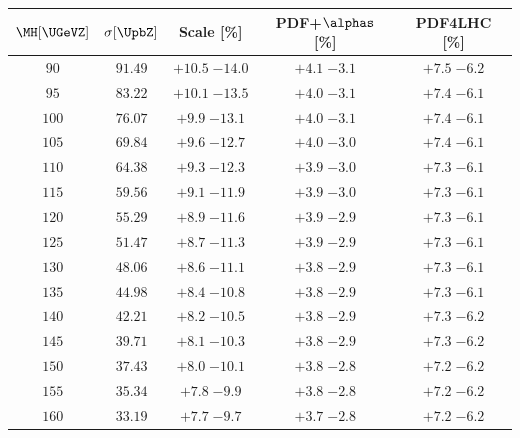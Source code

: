 \begin{table}

   \begin{center}
   \small
   \begin{tabular}{ccccc}
   \hline
   $\MH[\UGeVZ]$ & $\sigma[\UpbZ]$ & Scale [\%] & PDF+$\alphas$ [\%] & \small{PDF4LHC} [\%]\\
   \hline
 $ 90 $&$ 91.49 $& $ {+10.5}  \;{-14.0} $ & $ {+ 4.1}  \;{- 3.1} $ & $ {+ 7.5}  \;{- 6.2} $ \\
 $ 95 $&$ 83.22 $& $ {+10.1}  \;{-13.5} $ & $ {+ 4.0}  \;{- 3.1} $ & $ {+ 7.4}  \;{- 6.1} $ \\
 $100 $&$ 76.07$ & $ {+ 9.9}  \;{-13.1} $ & $ {+ 4.0}  \;{- 3.1} $ & $ {+ 7.4}  \;{- 6.1} $ \\
 $105 $&$ 69.84$ & $ {+ 9.6}  \;{-12.7} $ & $ {+ 4.0}  \;{- 3.0} $ & $ {+ 7.4}  \;{- 6.1} $ \\
 $110 $&$ 64.38 $& $ {+ 9.3}  \;{-12.3} $ & $ {+ 3.9}  \;{- 3.0} $ & $ {+ 7.3}  \;{- 6.1} $ \\
 $115 $&$ 59.56 $& $ {+ 9.1}  \;{-11.9} $ & $ {+ 3.9}  \;{- 3.0} $ & $ {+ 7.3}  \;{- 6.1} $ \\
 $120 $&$ 55.29 $& $ {+ 8.9}  \;{-11.6} $ & $ {+ 3.9}  \;{- 2.9} $ & $ {+ 7.3}  \;{- 6.1} $ \\
 $125 $&$ 51.47 $& $ {+ 8.7}  \;{-11.3} $ & $ {+ 3.9}  \;{- 2.9} $ & $ {+ 7.3}  \;{- 6.1} $ \\
 $130 $&$ 48.06 $& $ {+ 8.6}  \;{-11.1} $ & $ {+ 3.8}  \;{- 2.9} $ & $ {+ 7.3}  \;{- 6.1} $ \\
 $135 $&$ 44.98 $& $ {+ 8.4}  \;{-10.8} $ & $ {+ 3.8}  \;{- 2.9} $ & $ {+ 7.3}  \;{- 6.1} $ \\
 $140 $&$ 42.21 $& $ {+ 8.2}  \;{-10.5} $ & $ {+ 3.8}  \;{- 2.9} $ & $ {+ 7.3}  \;{- 6.2} $ \\
 $145 $&$ 39.71 $& $ {+ 8.1}  \;{-10.3} $ & $ {+ 3.8}  \;{- 2.9} $ & $ {+ 7.3}  \;{- 6.2} $ \\
 $150 $&$ 37.43 $& $ {+ 8.0}  \;{-10.1} $ & $ {+ 3.8}  \;{- 2.8} $ & $ {+ 7.2}  \;{- 6.2} $ \\
 $155 $&$ 35.34 $& $ {+ 7.8}  \;{- 9.9} $ & $ {+ 3.8}  \;{- 2.8} $ & $ {+ 7.2}  \;{- 6.2} $ \\
 $160 $&$ 33.19 $& $ {+ 7.7}  \;{- 9.7} $ & $ {+ 3.7}  \;{- 2.8} $ & $ {+ 7.2}  \;{- 6.2} $ \\

\end{tabular}
\end{center}
\end{table}
